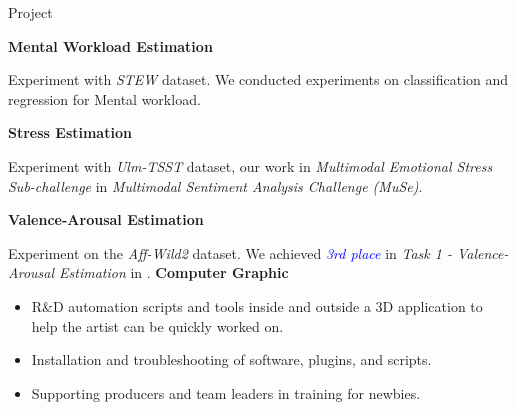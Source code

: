\begin{rubric}{Project}

\entry*[03/2022 -- present]%
	\textbf{Mental Workload Estimation}\par
	Experiment with \textit{ STEW} dataset. We conducted experiments on classification and regression for Mental workload.


\entry*[04/2022 -- 06/2022]%
	\textbf{Stress Estimation}\par
	Experiment with \textit{ Ulm-TSST} dataset, our work in \textit{Multimodal Emotional Stress Sub-challenge} in \textit{Multimodal Sentiment Analysis Challenge (MuSe)}.

%
\entry*[01/2022 -- 03/2022]%
	\textbf{Valence-Arousal Estimation}\par
	Experiment on the \textit{Aff-Wild2} dataset. We achieved \textcolor{blue}{\textit{3rd place}} in \textit{Task 1 - Valence-Arousal Estimation} in \href{https://ibug.doc.ic.ac.uk/resources/cvpr-2022-3rd-abaw/}{}. \href{https://github.com/honghai-nguyen/ABAW3-VAEstimation}{\color{blue}{Project page.}}
%
\entry*[10/2018 -- 01/2021]%
	\textbf{Computer Graphic}\par
        \begin{itemize}
            \item R\&D automation scripts and tools inside and outside a 3D application to help the artist can be quickly worked on.
            \item Installation and troubleshooting of software, plugins, and scripts.
            \item Supporting producers and team leaders in training for newbies.
           
            
        \end{itemize}
        
\end{rubric}